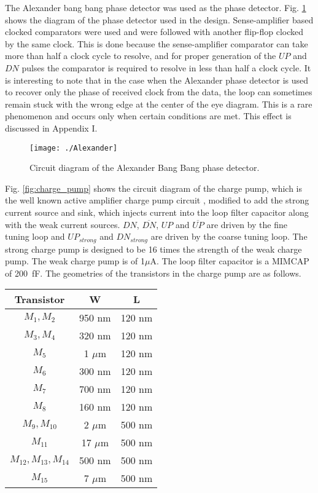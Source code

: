 \documentclass[journal,twoside,letterpaper]{IEEEtran}
\begin{document}
The Alexander bang bang phase detector was used as the phase detector. 
Fig. \ref{fig:alex} shows the diagram of the phase detector
used in the design.
Sense-amplifier based clocked comparators \cite{Nikolic-jssc-2000}
were used and were followed with another flip-flop 
clocked by the same clock.
This is done because the sense-amplifier comparator can take
more than half a clock cycle to resolve,
and for proper generation of the $UP$ and $DN$ pulses
the comparator is required to resolve in less than half a clock cycle.
It is interesting to note that in the case
when the Alexander phase detector is used
to recover only the phase of received clock from the data,
the loop can sometimes remain stuck
with the wrong edge at the center of the eye diagram.
This is a rare phenomenon and occurs only
when certain conditions are met.
This effect is discussed in Appendix I.
\begin{figure}[h!]
\centering
\texttt{[image: ./Alexander]}
\caption{Circuit diagram of the Alexander Bang Bang phase detector.}
\label{fig:alex}
\end{figure}

Fig. \ref{fig:charge_pump} shows the circuit 
diagram of the charge pump,
which is the well known active amplifier charge pump circuit 
\cite{active_CP}, modified to add the strong current source and sink, which
injects current into the loop filter capacitor along with
the weak current sources.
$DN$, $\overline{DN}$, $UP$ and $\overline{UP}$
are driven by the fine tuning loop
and $UP_{strong}$ and $DN_{strong}$ are driven
by the coarse tuning loop.
The strong charge pump is designed to be
16 times the strength of the weak charge pump.
The weak charge pump is of 1$\mu$A.
The loop filter capacitor is a MIMCAP of \mbox{200 fF}. 
The geometries of the transistors in the
charge pump are as follows.
\begin{center}
\begin{tabular}{|c|c|c|}
\hline
Transistor & W & L \\ \hline
$M_1,M_2$ & 950 nm & 120 nm \\ \hline
$M_3,M_4$ & 320 nm & 120 nm \\ \hline
$M_5$ & 1 $\mu$m & 120 nm \\ \hline 
$M_6$ & 300 nm & 120 nm \\ \hline
$M_7$ & 700 nm & 120 nm \\ \hline
$M_8$ & 160 nm & 120 nm \\ \hline
$M_9,M_{10}$ & 2 $\mu$m & 500 nm \\ \hline
$M_{11}$ & 17 $\mu$m & 500 nm \\ \hline
$M_{12},M_{13},M_{14}$ & 500 nm & 500 nm \\ \hline
$M_{15}$ & 7 $\mu$m & 500 nm \\ \hline 
\end{tabular}
\end{center}
\end{document}
